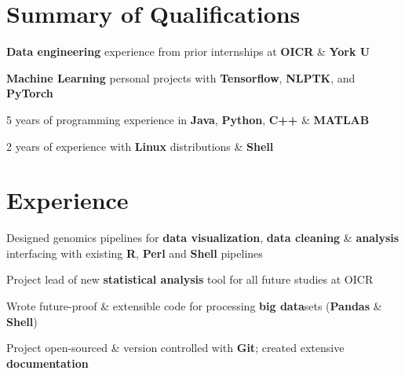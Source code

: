\documentclass[]{chandan-cv}
\begin{document}
\begin{minipage}[t]{0.71\textwidth}


\section{Summary of Qualifications}
\runsubsection{ }
\descript{ }
\location{ }
\vspace{\topsep} %
\begin{tightemize}
	\item \textbf{Data engineering} experience from prior internships at \textbf{OICR} \& \textbf{York U}
	\item \textbf{Machine Learning} personal projects with \textbf{Tensorflow}, \textbf{NLPTK}, and \textbf{PyTorch}
	\item 5 years of programming experience in \textbf{Java}, \textbf{Python}, \textbf{C++} \& \textbf{MATLAB}
	\item 2 years of experience with \textbf{Linux} distributions \& \textbf{Shell}
\end{tightemize}
\sectionsep


\section{Experience}
\begin{tightemize}
	\item Designed genomics pipelines for \textbf{data visualization}, \textbf{data cleaning} \& \textbf{analysis} interfacing with existing \textbf{R}, \textbf{Perl} and \textbf{Shell} pipelines
	\item Project lead of new \textbf{statistical analysis} tool for all future studies at OICR
	\item Wrote future-proof \& extensible code for processing \textbf{big data}sets (\textbf{Pandas} \& \textbf{Shell})
	\item Project open-sourced \& version controlled with \textbf{Git}; created extensive \textbf{documentation}
\end{tightemize}
\sectionsep


\end{minipage}
\end{document}

